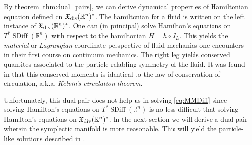 \documentclass[12pt]{amsart}
\newcommand{\R}{\ensuremath{\mathbb{R}}}
\DeclareMathOperator{\SDiff}{SDiff}
\begin{document}
By theorem \ref{thm:dual_pairs}, we can derive dynamical properties of Hamiltonian equation defined on $\mathfrak{X}_{\rm div}(\R^n)^*$.
The hamiltonian for a fluid is written on the left instance of $\mathfrak{X}_{\rm div}(\R^n)^*$.
One can (in principal) solve Hamilton's equations on $T^*\SDiff(\R^n)$
with respect to the hamiltonian $H = h \circ J_L$.
This yields the \emph{material} or \emph{Lagrangian} coordinate perspective
of fluid mechanics one encounters in their first course on continuum
mechanics.
The right leg yields conserved quantites associated to the particle relabling symmetry of the fluid.
It was found in \cite{Arnold1966} that this conserved momenta is identical
to the law of conservation of circulation, a.k.a. \emph{Kelvin's circulation theorem}.

Unfortunately, this dual pair does not help us in solving \eqref{eq:MMDiff}
since solving Hamilton's equations on $T^*\SDiff(\R^n)$ is no less difficult
that solving Hamilton's equations on $\mathfrak{X}_{\rm div}(\R^n)^*$.
In the next section we will derive a dual pair wherein the symplectic
manifold is more reasonable.
This will yield the particle-like solutions described in \cite{MumfordMichor2013}.
\end{document}
